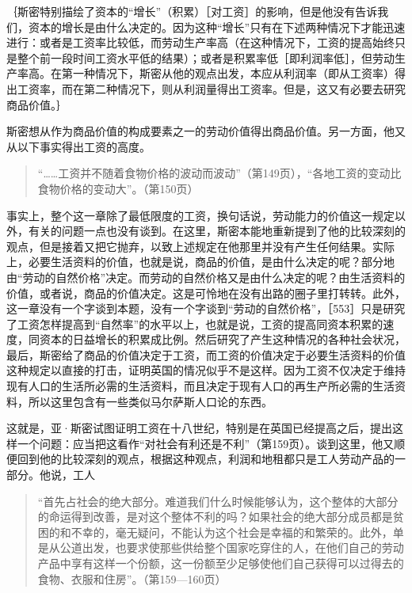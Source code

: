 ｛斯密特别描绘了资本的“增长”（积累）［对工资］的影响，但是他没有告诉我们，资本的增长是由什么决定的。因为这种“增长”只有在下述两种情况下才能迅速进行：或者是工资率比较低，而劳动生产率高（在这种情况下，工资的提高始终只是整个前一段时间工资水平低的结果）；或者是积累率低［即利润率低］，但劳动生产率高。在第一种情况下，斯密从他的观点出发，本应从利润率（即从工资率）得出工资率，而在第二种情况下，则从利润量得出工资率。但是，这又有必要去研究商品价值。｝

斯密想从作为商品价值的构成要素之一的劳动价值得出商品价值。另一方面，他又从以下事实得出工资的高度。

\begin{quote}{“……工资并不随着食物价格的波动而波动”（第149页），“各地工资的变动比食物价格的变动大”。（第150页）}\end{quote}

事实上，整个这一章除了最低限度的工资，换句话说，劳动能力的价值这一规定以外，有关的问题一点也没有谈到。在这里，斯密本能地重新提到了他的比较深刻的观点，但是接着又把它抛弃，以致上述规定在他那里并没有产生任何结果。实际上，必要生活资料的价值，也就是说，商品的价值，是由什么决定的呢？部分地由“劳动的自然价格”决定。而劳动的自然价格又是由什么决定的呢？由生活资料的价值，或者说，商品的价值决定。这是可怜地在没有出路的圈子里打转转。此外，这一章没有一个字谈到本题，没有一个字谈到“劳动的自然价格”，［553］只是研究了工资怎样提高到“自然率”的水平以上，也就是说，工资的提高同资本积累的速度，同资本的日益增长的积累成比例。然后研究了产生这种情况的各种社会状况，最后，斯密给了商品的价值决定于工资，而工资的价值决定于必要生活资料的价值这种规定以直接的打击，证明英国的情况似乎不是这样。因为工资不仅决定于维持现有人口的生活所必需的生活资料，而且决定于现有人口的再生产所必需的生活资料，所以这里包含有一些类似马尔萨斯人口论的东西。

这就是，亚·斯密试图证明工资在十八世纪，特别是在英国已经提高之后，提出这样一个问题：应当把这看作“对社会有利还是不利”（第159页）。谈到这里，他又顺便回到他的比较深刻的观点，根据这种观点，利润和地租都只是工人劳动产品的一部分。他说，工人

\begin{quote}{“首先占社会的绝大部分。难道我们什么时候能够认为，这个整体的大部分的命运得到改善，是对这个整体不利的吗？如果社会的绝大部分成员都是贫困的和不幸的，毫无疑问，不能认为这个社会是幸福的和繁荣的。此外，单是从公道出发，也要求使那些供给整个国家吃穿住的人，在他们自己的劳动产品中享有这样一个份额，这一份额至少足够使他们自己获得可以过得去的食物、衣服和住房”。（第159—160页）}\end{quote}

